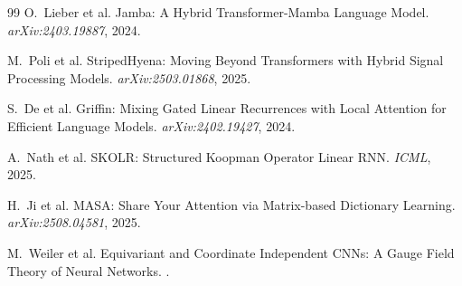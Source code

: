 \documentclass[11pt, a4paper]{article}
\theoremstyle{plain}
\theoremstyle{remark}
\begin{document}
\begin{thebibliography}{99}
O.~Lieber et al.
\newblock Jamba: A Hybrid Transformer-Mamba Language Model.
\newblock \emph{arXiv:2403.19887}, 2024.

M.~Poli et al.
\newblock StripedHyena: Moving Beyond Transformers with Hybrid Signal Processing Models.
\newblock \emph{arXiv:2503.01868}, 2025.

S.~De et al.
\newblock Griffin: Mixing Gated Linear Recurrences with Local Attention for Efficient Language Models.
\newblock \emph{arXiv:2402.19427}, 2024.

A.~Nath et al.
\newblock SKOLR: Structured Koopman Operator Linear RNN.
\newblock \emph{ICML}, 2025.

H.~Ji et al.
\newblock MASA: Share Your Attention via Matrix-based Dictionary Learning.
\newblock \emph{arXiv:2508.04581}, 2025.

M.~Weiler et al.
\newblock Equivariant and Coordinate Independent CNNs: A Gauge Field Theory of Neural Networks.
.

\end{thebibliography}
\end{document}
